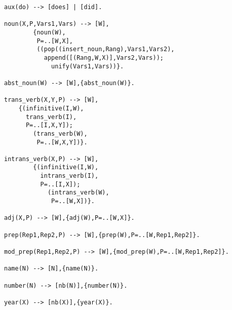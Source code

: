 \begin{verbatim}
aux(do) --> [does] | [did].

noun(X,P,Vars1,Vars) --> [W],
        {noun(W),
         P=..[W,X],
         ((pop((insert_noun,Rang),Vars1,Vars2),
           append([(Rang,W,X)],Vars2,Vars));
             unify(Vars1,Vars))}.

abst_noun(W) --> [W],{abst_noun(W)}.

trans_verb(X,Y,P) --> [W],
	{(infinitive(I,W),
	  trans_verb(I),
	  P=..[I,X,Y]);
	    (trans_verb(W),
	     P=..[W,X,Y])}.

intrans_verb(X,P) --> [W],
        {(infinitive(I,W),
          intrans_verb(I),
          P=..[I,X]);
            (intrans_verb(W),
             P=..[W,X])}.

adj(X,P) --> [W],{adj(W),P=..[W,X]}.

prep(Rep1,Rep2,P) --> [W],{prep(W),P=..[W,Rep1,Rep2]}.

mod_prep(Rep1,Rep2,P) --> [W],{mod_prep(W),P=..[W,Rep1,Rep2]}.

name(N) --> [N],{name(N)}.

number(N) --> [nb(N)],{number(N)}.

year(X) --> [nb(X)],{year(X)}.
\end{verbatim}

